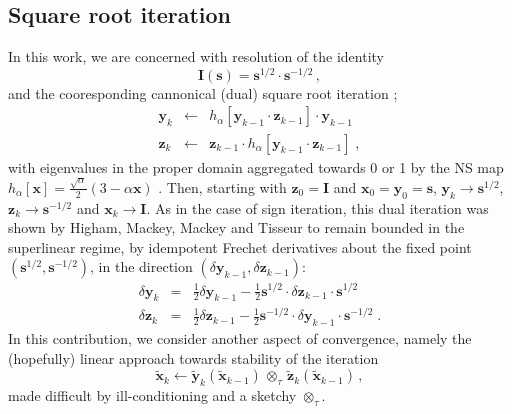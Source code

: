 \documentclass[letterpaper,twocolumn,amsmath,amsfont,amssymb,english,aps,jcp,preprintnumbers,groupaddress,nofootinbib,tightenlines]{revtex4}
\newcommand{\mat}[1]{\boldsymbol{#1}}
\newcommand{\ot}{ {\scriptstyle \otimes}_{ \tau } }
\begin{document}
\subsection{Square root iteration}
In this work, we are concerned with  resolution of the identity \cite{}
\begin{equation}
\mat{I} \left( \mat{s} \right) =\mat{s}^{1/2} \cdot \mat{s}^{-1/2} \, ,
\end{equation}
and the cooresponding cannonical (dual) square root iteration \cite{};
\begin{eqnarray}\label{cannonical}
\mat{y}_k &\leftarrow& h_\alpha \left[ \mat{y}_{k-1} \cdot \mat{z}_{k-1} \right] \cdot \mat{y}_{k-1}  \nonumber \\
\mat{z}_k &\leftarrow& \mat{z}_{k-1} \cdot h_\alpha \left[ \mat{y}_{k-1} \cdot \mat{z}_{k-1} \right] \; ,
\end{eqnarray}
with eigenvalues in the proper domain aggregated towards 0 or 1 by the
NS map $h_\alpha[\mat{x}]=\frac{\sqrt{\alpha}}{2} \left(3-\alpha \mat{x} \right)$  \cite{}. Then,
starting with $\mat{z}_0=\mat{I}$ and $\mat{x}_0=\mat{y}_0=\mat{s}$,
${\mat{y}}_k \rightarrow \mat{s}^{1/2}$, ${\mat{z}}_k \rightarrow \mat{s}^{-1/2}$ and ${\mat{x}}_k \rightarrow {\mat{I}}$.
As in the case of sign iteration, this dual iteration was shown by Higham, Mackey,  Mackey and Tisseur \cite{Higham2005}
to remain bounded in the superlinear regime, by idempotent Frechet derivatives about the fixed point $\left(\mat{s}^{1/2},\mat{s}^{-1/2}\right)$,
in the direction $\left( \delta \mat{y}_{k-1} , \delta \mat{z}_{k-1} \right)$:
\begin{eqnarray}
\delta \mat{y}_k &=& \frac{1}{2} \delta \mat{y}_{k-1} - \frac{1}{2} \mat{s}^{1/2} \cdot \delta \mat{z}_{k-1} \cdot \mat{s}^{1/2} \\
\delta \mat{z}_k &=& \frac{1}{2} \delta \mat{z}_{k-1} - \frac{1}{2} \mat{s}^{-1/2} \cdot \delta \mat{y}_{k-1} \cdot \mat{s}^{-1/2} \;.
\end{eqnarray}
In this contribution, we consider another aspect of convergence, namely the (hopefully) linear approach towards stability of the iteration
\begin{equation}
\widetilde{\mat{x}}_k \leftarrow
 \widetilde{\mat{y}}_k \left( \widetilde{\mat{x}}_{k-1} \right)
\, \ot \, \widetilde{\mat{z}}_k \left( \widetilde{\mat{x}}_{k-1} \right) \, ,
\end{equation}
made difficult by ill-conditioning and a sketchy $\ot$.
\end{document}
